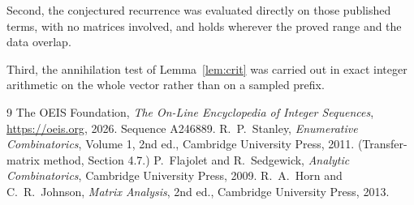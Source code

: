 \documentclass[11pt,a4paper]{article}
\theoremstyle{plain}
\theoremstyle{definition}
\begin{document}
Second, the conjectured recurrence was evaluated directly on those published terms, with no
matrices involved, and holds wherever the proved range and the data overlap.

Third, the annihilation test of Lemma~\ref{lem:crit} was carried out in exact integer
arithmetic on the whole vector rather than on a sampled prefix.

\begin{thebibliography}{9}
 The OEIS Foundation, \emph{The On-Line Encyclopedia of Integer
Sequences}, \url{https://oeis.org}, 2026. Sequence A246889.
 R.~P.~Stanley, \emph{Enumerative Combinatorics}, Volume 1, 2nd ed.,
Cambridge University Press, 2011. (Transfer-matrix method, Section 4.7.)
 P.~Flajolet and R.~Sedgewick, \emph{Analytic Combinatorics}, Cambridge
University Press, 2009.
 R.~A.~Horn and C.~R.~Johnson, \emph{Matrix Analysis}, 2nd ed., Cambridge
University Press, 2013.
\end{thebibliography}
\end{document}
